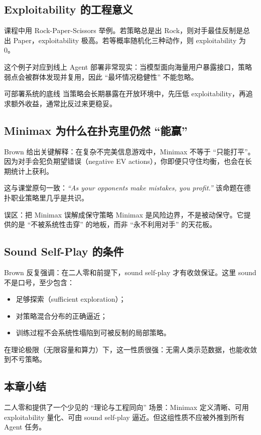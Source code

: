 \documentclass[a4paper]{article}
\begin{document}
\subsection{Exploitability 的工程意义}
课程中用 Rock-Paper-Scissors 举例。若策略总是出 Rock，则对手最佳反制是总出 Paper，exploitability 极高。若等概率随机化三种动作，则 exploitability 为 0。

这个例子对应到线上 Agent 部署非常现实：当模型面向海量用户暴露接口，策略弱点会被群体发现并复用，因此 ``最坏情况稳健性'' 不能忽略。

\begin{importantbox}{可部署系统的底线}
当策略会长期暴露在开放环境中，先压低 exploitability，再追求额外收益，通常比反过来更稳妥。
\end{importantbox}

\subsection{Minimax 为什么在扑克里仍然 ``能赢''}
Brown 给出关键解释：在复杂不完美信息游戏中，Minimax 不等于 ``只能打平''。因为对手会犯负期望错误（negative EV actions），你即便只守住均衡，也会在长期统计上获利。

这与课堂原句一致：\textit{``As your opponents make mistakes, you profit.''} 该命题在德扑职业策略里几乎是共识。

\begin{warningbox}{误区：把 Minimax 误解成保守策略}
Minimax 是风险边界，不是被动保守。它提供的是 ``不被系统性击穿'' 的地板，而非 ``永不利用对手'' 的天花板。
\end{warningbox}

\subsection{Sound Self-Play 的条件}
Brown 反复强调：在二人零和前提下，sound self-play 才有收敛保证。这里 sound 不是口号，至少包含：
\begin{itemize}
    \item 足够探索（sufficient exploration）；
    \item 对策略混合分布的正确逼近；
    \item 训练过程不会系统性塌陷到可被反制的局部策略。
\end{itemize}

在理论极限（无限容量和算力）下，这一性质很强：无需人类示范数据，也能收敛到不亏策略。

\subsection{本章小结}
二人零和提供了一个少见的 ``理论与工程同向'' 场景：Minimax 定义清晰、可用 exploitability 量化、可由 sound self-play 逼近。但这组性质不应被外推到所有 Agent 任务。
\end{document}
